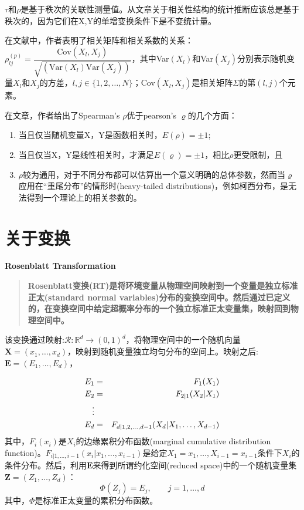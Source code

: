 \textcolor[rgb]{1,0,0}{$\tau$和$\rho$是基于秩次的关联性测量值。从文章\cite{Genest2007}关于相关性结构的统计推断应该总是基于秩次的，因为它们在X,Y的单增变换条件下是不变统计量。}


在文献\cite{Deligiannis2012}中，作者表明了相关矩阵和相关系数的关系：$\rho_{lj}^{(p)} = \dfrac{\text{Cov}(X_l,X_j)}{\sqrt{\left(\text{Var}(X_l)\text{Var}(X_j)\right)}}$，其中Var$(X_l)$和Var$(X_j)$分别表示随机变量$X_l$和$X_j$的方差，$l,j \in \{1,2,\dots,N\}$；Cov$(X_l,X_j)$是相关矩阵$\Sigma$的第$(l,j)$个元素。

在文章\cite{Genest2007}，作者给出了Spearman's $\rho$优于pearson's $\varrho$的几个方面：
\begin{enumerate}[1.]
    \item 当且仅当随机变量X，Y是函数相关时，$E(\rho) = \pm 1$;
    \item 当且仅当X，Y是线性相关时，才满足$E(\varrho) = \pm 1$，相比$\rho$更受限制，且
    \item $\rho$较为通用，对于不同分布都可以估算出一个意义明确的总体参数，然而当$\varrho$应用在``重尾分布''的情形时(heavy-tailed distributions)，例如柯西分布，是无法得到一个理论上的相关参数的。
\end{enumerate}



\section{关于变换}
\textbf{\textcolor[rgb]{1,0,0}{Rosenblatt Transformation}}
\begin{quotation}
    \textbf{\textcolor[rgb]{1,0,0}{Rosenblatt变换(RT)是将环境变量从物理空间映射到一个变量是独立标准正太(standard normal variables)分布的变换空间中。然后通过已定义的，在变换空间中给定超概率分布的一个独立标准正太变量集，映射回到物理空间中。}}\cite{Montes2015}
\end{quotation}


该变换通过映射:$\mathcal{R}: \mathbb{R}^d \rightarrow (0,1)^d$，将物理空间中的一个随机向量$\mathbf{X}=(x_1,\dots,x_d)$，映射到随机变量独立均匀分布的空间上。映射之后:$\mathbf{E} = (E_1,\dots,E_d)$\cite{Montes2015}，

\begin{eqnarray}
    E_1 &=& F_1(X_1)  \notag \\
    E_2 &=& F_{2|1}(X_2|X_1) \notag \\
    \vdots \\
    E_d &=& F_{d|1,2,\dots,d-1} (X_d | X_1,\dots,X_{d-1}) \notag
    \label{eq-rosenblatt}
\end{eqnarray}
其中，$F_i(x_i)$是$X_i$的\textcolor[rgb]{1,0,0}{边缘累积分布函数(marginal cumulative distribution function)}。$F_{i|1,\dots,i-1}(x_i|x_1,\dots,x_{i-1})$是给定$X_1 = x_1,\dots,X_{i-1}=x_{i-1}$条件下$X_i$的条件分布。然后，利用$\mathbf{E}$来得到所谓\textcolor[rgb]{1,0,0}{约化空间(reduced space)}中的一个随机变量集$\mathbf{Z} = (Z_1,\dots,Z_d)$：
\begin{equation}
    \Phi (Z_j) = E_j, \qquad j=1,\dots,d
    \label{eq-cdf}
\end{equation}
其中，$\Phi$是标准正太变量的累积分布函数。

